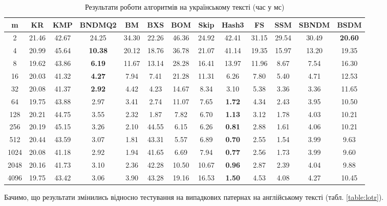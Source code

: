 \documentclass[a4paper,14pt]{extarticle} %
\begin{document}
				\begin{table}[H]
					\centering
					\scriptsize
					\begin{tabular}{|c|c|c|c|c|c|c|c|c|c|c|c|c|}
					\hline
					\textbf{m} & \textbf{KR} & \textbf{KMP} & \textbf{BNDMQ2} & \textbf{BM} & \textbf{BXS} & \textbf{BOM} & \textbf{Skip} & \textbf{Hash3} & \textbf{FS} & \textbf{SSM} & \textbf{SBNDM} & \textbf{BSDM} \\
					\hline
					2 & 21.46 & 42.67 & 24.25 & 34.30 & 22.26 & 46.36 & 24.92 & 42.41 & 31.15 & 29.54 & 30.49 & \textbf{20.60} \\
					\hline
					4 & 20.99 & 45.64 & \textbf{10.38} & 20.12 & 18.76 & 36.78 & 21.07 & 41.14 & 19.35 & 15.97 & 13.20 & 19.35 \\
					\hline
					8 & 19.62 & 43.86 & \textbf{6.19} & 11.67 & 13.14 & 28.28 & 16.41 & 13.97 & 11.96 & 8.67 & 7.54 & 16.30 \\
					\hline
					16 & 20.03 & 41.32 & \textbf{4.27} & 7.94 & 7.41 & 21.28 & 11.31 & 6.26 & 7.80 & 5.40 & 4.71 & 12.53 \\
					\hline
					32 & 20.08 & 41.37 & \textbf{2.92} & 4.42 & 4.23 & 14.67 & 8.34 & 3.10 & 5.38 & 3.36 & 3.36 & 11.65 \\
					\hline
					64 & 19.75 & 43.88 & 2.97 & 3.41 & 2.74 & 11.07 & 7.65 & \textbf{1.72} & 4.34 & 2.43 & 3.95 & 10.50 \\
					\hline
					128 & 20.21 & 44.75 & 3.55 & 2.32 & 1.87 & 7.82 & 6.70 & \textbf{1.13} & 3.12 & 1.78 & 4.03 & 10.21 \\
					\hline
					256 & 20.19 & 45.15 & 3.26 & 2.10 & 44.55 & 6.15 & 6.26 & \textbf{0.81} & 2.88 & 1.61 & 4.06 & 10.21 \\
					\hline
					512 & 20.44 & 43.59 & 3.07 & 1.81 & 43.31 & 5.57 & 6.89 & \textbf{0.70} & 2.55 & 1.54 & 3.99 & 9.63 \\
					\hline
					1024 & 20.08 & 41.18 & 2.92 & 1.94 & 41.65 & 6.69 & 7.94 & \textbf{0.77} & 2.56 & 1.73 & 3.99 & 9.60 \\
					\hline
					2048 & 20.16 & 41.73 & 3.10 & 2.36 & 42.28 & 10.50 & 10.67 & \textbf{0.96} & 2.87 & 2.39 & 4.04 & 9.88 \\
					\hline
					4096 & 19.75 & 43.42 & 3.06 & 3.90 & 43.28 & 19.16 & 16.53 & \textbf{1.50} & 4.53 & 4.08 & 4.27 & 10.45 \\
					\hline
					\end{tabular}
					\caption{Результати роботи алгоритмів на українському тексті (час у мс)}
					\label{table:lesya}
					\end{table}
				Бачимо, що результати змінились відносно тестування на випадкових патернах на англійському тексті (табл. \ref{table:lotr}).
\end{document}
